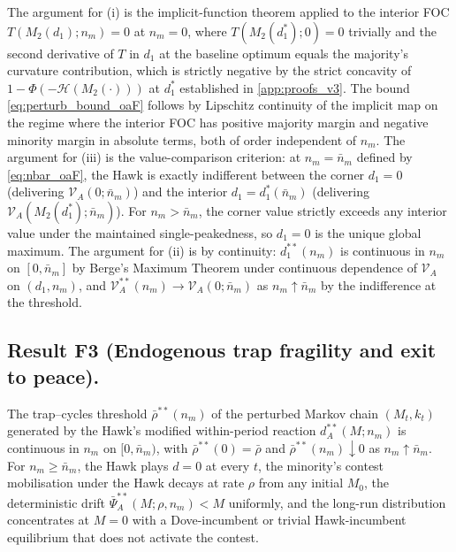 \documentclass[11pt,twoside]{extarticle}
\begin{document}
The argument for (i) is the implicit-function theorem applied to the interior FOC $T(M_2(d_1);n_m)=0$ at $n_m=0$, where $T(M_2(d_1^{*});0)=0$ trivially and the second derivative of $T$ in $d_1$ at the baseline optimum equals the majority's curvature contribution, which is strictly negative by the strict concavity of $1-\Phi(-\mathcal H(M_2(\cdot)))$ at $d_1^{*}$ established in \autoref{app:proofs_v3}. The bound \eqref{eq:perturb_bound_oaF} follows by Lipschitz continuity of the implicit map on the regime where the interior FOC has positive majority margin and negative minority margin in absolute terms, both of order independent of $n_m$. The argument for (iii) is the value-comparison criterion: at $n_m=\bar n_m$ defined by \eqref{eq:nbar_oaF}, the Hawk is exactly indifferent between the corner $d_1=0$ (delivering $\mathcal V_A(0;\bar n_m)$) and the interior $d_1=d_1^{*}(\bar n_m)$ (delivering $\mathcal V_A(M_2(d_1^{*});\bar n_m)$). For $n_m>\bar n_m$, the corner value strictly exceeds any interior value under the maintained single-peakedness, so $d_1=0$ is the unique global maximum. The argument for (ii) is by continuity: $d_1^{**}(n_m)$ is continuous in $n_m$ on $[0,\bar n_m]$ by Berge's Maximum Theorem under continuous dependence of $\mathcal V_A$ on $(d_1,n_m)$, and $\mathcal V_A^{**}(n_m)\to\mathcal V_A(0;\bar n_m)$ as $n_m\uparrow\bar n_m$ by the indifference at the threshold.

\subsection*{Result F3 (Endogenous trap fragility and exit to peace).} The trap--cycles threshold $\bar\rho^{**}(n_m)$ of the perturbed Markov chain $(M_t,k_t)$ generated by the Hawk's modified within-period reaction $d_A^{**}(M;n_m)$ is continuous in $n_m$ on $[0,\bar n_m)$, with $\bar\rho^{**}(0)=\bar\rho$ and $\bar\rho^{**}(n_m)\downarrow 0$ as $n_m\uparrow\bar n_m$. For $n_m\ge\bar n_m$, the Hawk plays $d=0$ at every $t$, the minority's contest mobilisation under the Hawk decays at rate $\rho$ from any initial $M_0$, the deterministic drift $\bar\Psi_A^{**}(M;\rho,n_m)<M$ uniformly, and the long-run distribution concentrates at $M=0$ with a Dove-incumbent or trivial Hawk-incumbent equilibrium that does not activate the contest.
\end{document}
